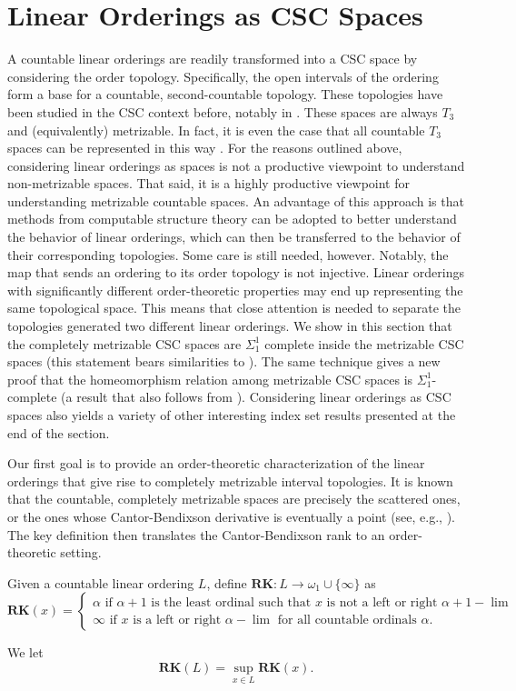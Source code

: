 \documentclass[11pt]{amsart}
\theoremstyle{remark}
\def\RK{\textbf{RK}}
\begin{document}
\section{Linear Orderings as CSC Spaces}

A countable linear orderings are readily transformed into a CSC space by considering the order topology.
Specifically, the open intervals of the ordering form a base for a countable, second-countable topology.
These topologies have been studied in the CSC context before, notably in \cite{Gao04,S20,G24}.
These spaces are always $T_3$ and (equivalently) metrizable.
In fact, it is even the case that all countable $T_3$ spaces can be represented in this way \cite{L62}.
For the reasons outlined above, considering linear orderings as spaces is not a productive viewpoint to understand non-metrizable spaces.
That said, it is a highly productive viewpoint for understanding metrizable countable spaces.
An advantage of this approach is that methods from computable structure theory can be adopted to better understand the behavior of linear orderings, which can then be transferred to the behavior of their corresponding topologies.
Some care is still needed, however.
Notably, the map that sends an ordering to its order topology is not injective.
Linear orderings with significantly different order-theoretic properties may end up representing the same topological space.
This means that close attention is needed to separate the topologies generated two different linear orderings.
We show in this section that the completely metrizable CSC spaces are $\Sigma_1^1$ complete inside the metrizable CSC spaces (this statement bears similarities to \cite[Corollary 12.10]{G24}).
The same technique gives a new proof that the homeomorphism relation among metrizable CSC spaces is $\Sigma_1^1$-complete (a result that also follows from \cite[Theorem 4.2]{Gao04}).
Considering linear orderings as CSC spaces also yields a variety of other interesting index set results presented at the end of the section.

Our first goal is to provide an order-theoretic characterization of the linear orderings that give rise to completely metrizable interval topologies.
It is known that the countable, completely metrizable spaces are precisely the scattered ones, or the ones whose Cantor-Bendixson derivative is eventually a point (see, e.g., \cite[Theorems 12.1 and 12.13]{G24}).
The key definition then translates the Cantor-Bendixson rank to an order-theoretic setting.

\begin{definition}
Given a countable linear ordering $L$, define $\RK: L\to \omega_1 \cup \{\infty\}$ as
\[\RK(x) = \begin{cases}
\alpha \text{    if  } \alpha+1 \text{ is the least ordinal such that } x  \text{ is not a left or right } \alpha+1-\lim\\
\infty \text{    if } x \text{ is a left or right } \alpha-\lim \text{ for all countable ordinals } \alpha.
\end{cases}
\]

We let 
\[\RK(L)=\sup_{x\in L} \RK(x).\]
\end{definition}
\end{document}
